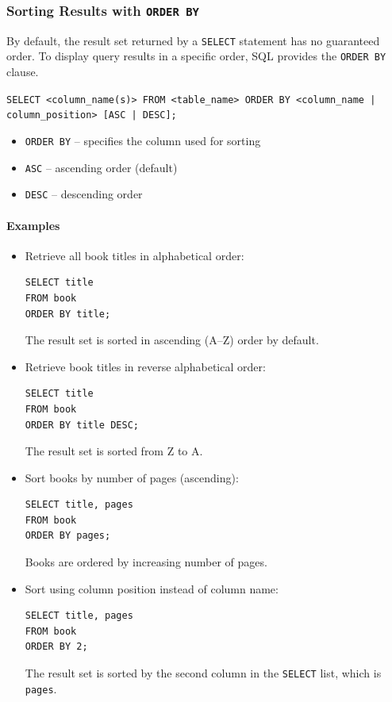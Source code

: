 \documentclass{article}
\begin{document}
\subsubsection{Sorting Results with \texttt{ORDER BY}}

By default, the result set returned by a \texttt{SELECT} statement has no guaranteed order.  
To display query results in a specific order, SQL provides the \texttt{ORDER BY} clause.

\begin{FormulaBox}
\texttt{SELECT <column\_name(s)> FROM <table\_name> ORDER BY <column\_name | column\_position> [ASC | DESC];}
\end{FormulaBox}

\begin{itemize}
    \item \texttt{ORDER BY} – specifies the column used for sorting
    \item \texttt{ASC} – ascending order (default)
    \item \texttt{DESC} – descending order
\end{itemize}

\paragraph{Examples}
\begin{itemize}
    \item Retrieve all book titles in alphabetical order:
\begin{verbatim}
SELECT title
FROM book
ORDER BY title;
\end{verbatim}
The result set is sorted in ascending (A–Z) order by default.

    \item Retrieve book titles in reverse alphabetical order:
\begin{verbatim}
SELECT title
FROM book
ORDER BY title DESC;
\end{verbatim}
The result set is sorted from Z to A.

    \item Sort books by number of pages (ascending):
\begin{verbatim}
SELECT title, pages
FROM book
ORDER BY pages;
\end{verbatim}
Books are ordered by increasing number of pages.

    \item Sort using column position instead of column name:
\begin{verbatim}
SELECT title, pages
FROM book
ORDER BY 2;
\end{verbatim}
The result set is sorted by the second column in the \texttt{SELECT} list, which is \texttt{pages}.
\end{itemize}
\end{document}
